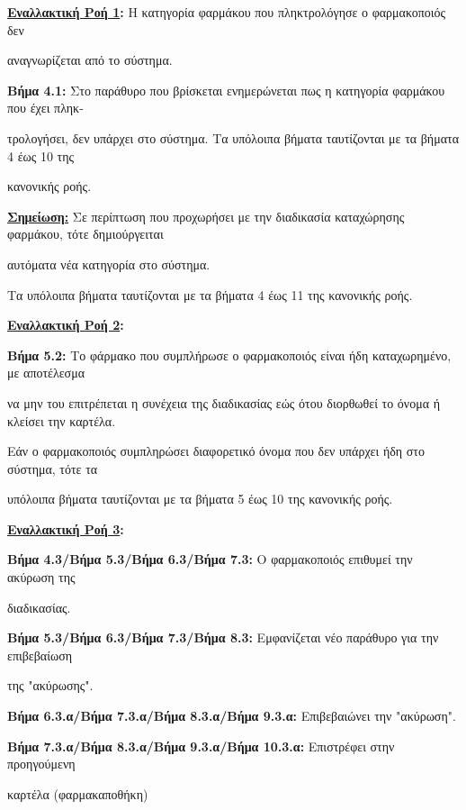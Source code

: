 \documentclass{article}
\begin{document}
 \textbf{\underline{Εναλλακτική Ροή 1}:}  
Η κατηγορία φαρμάκου που πληκτρολόγησε ο φαρμακοποιός δεν \par αναγνωρίζεται από το σύστημα. \vspace{0.1cm}
\par \textbf{Βήμα 4.1:} Στο παράθυρο που βρίσκεται ενημερώνεται πως η κατηγορία φαρμάκου που έχει πληκ- \par τρολογήσει, δεν υπάρχει στο σύστημα.
Τα υπόλοιπα βήματα ταυτίζονται με τα βήματα 4 έως 10 της \par κανονικής ροής. \vspace{0.1cm}
\par \textbf{\underline{Σημείωση:}} Σε περίπτωση που προχωρήσει με την διαδικασία καταχώρησης φαρμάκου, τότε δημιούργειται \par αυτόματα νέα κατηγορία στο σύστημα. \vspace{0.1cm}

\par Τα υπόλοιπα βήματα ταυτίζονται με τα βήματα 4 έως 11 της κανονικής ροής.\vspace{0.1cm}

\vspace{0.2cm}
 
\textbf{\underline{Εναλλακτική Ροή 2}:} \vspace{0.2cm} 
\par \textbf{Βήμα 5.2:} Το φάρμακο που συμπλήρωσε ο φαρμακοποιός είναι ήδη καταχωρημένο, με αποτέλεσμα \par να μην του επιτρέπεται η συνέχεια της διαδικασίας εώς ότου διορθωθεί το όνομα ή κλείσει την καρτέλα.\vspace{0.1cm}

\par Εάν ο φαρμακοποιός συμπληρώσει διαφορετικό όνομα που δεν υπάρχει ήδη στο σύστημα, τότε τα \par υπόλοιπα βήματα ταυτίζονται με τα βήματα 5 έως 10 της κανονικής ροής.

\vspace{0.2cm}

\textbf{\underline{Εναλλακτική Ροή 3}:} \newline
\par \textbf{Βήμα 4.3/Βήμα 5.3/Βήμα 6.3/Βήμα 7.3:} Ο φαρμακοποιός επιθυμεί την ακύρωση της \par διαδικασίας.

\vspace{0.2cm}

\par \textbf{Βήμα 5.3/Βήμα 6.3/Βήμα 7.3/Βήμα 8.3:} Εμφανίζεται νέο παράθυρο για την επιβεβαίωση \par της  "ακύρωσης". \vspace{0.1cm}
\par \textbf{Βήμα 6.3.α/Βήμα 7.3.α/Βήμα 8.3.α/Βήμα 9.3.α:} Επιβεβαιώνει την "ακύρωση". \vspace{0.1cm}
\par \textbf{Βήμα 7.3.α/Βήμα 8.3.α/Βήμα 9.3.α/Βήμα 10.3.α:} Επιστρέφει στην προηγούμενη \par καρτέλα (φαρμακαποθήκη) \vspace{0.2cm}
\end{document}
